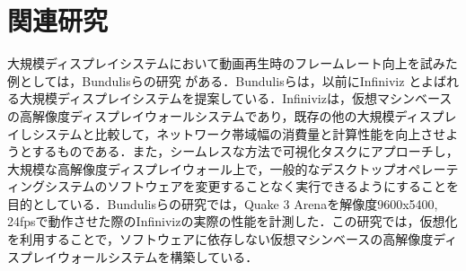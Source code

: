 \chapter{関連研究}

大規模ディスプレイシステムにおいて動画再生時のフレームレート向上を試みた例としては，Bundulisらの研究 \cite{bundulis2018infiniviz}がある．Bundulisらは，以前にInfiniviz \cite{bundulis2016infiniviz}とよばれる大規模ディスプレイシステムを提案している．Infinivizは，仮想マシンベースの高解像度ディスプレイウォールシステムであり，既存の他の大規模ディスプレイしシステムと比較して，ネットワーク帯域幅の消費量と計算性能を向上させようとするものである．また，シームレスな方法で可視化タスクにアプローチし，大規模な高解像度ディスプレイウォール上で，一般的なデスクトップオペレーティングシステムのソフトウェアを変更することなく実行できるようにすることを目的としている．Bundulisらの研究では，Quake 3 Arenaを解像度9600x5400, 24fpsで動作させた際のInfinivizの実際の性能を計測した．この研究では，仮想化を利用することで，ソフトウェアに依存しない仮想マシンベースの高解像度ディスプレイウォールシステムを構築している．